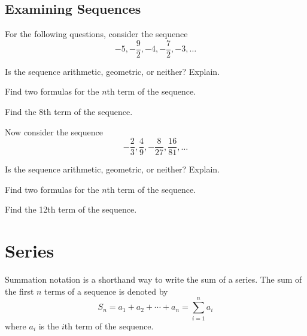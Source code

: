 \documentclass[addpoints]{exam}
\begin{document}
\subsection*{Examining Sequences}\label{subsec:examining_sequences1}
For the following questions, consider the sequence \[-5,-\frac{9}{2},-4,-\frac{7}{2},-3,\ldots\]
\begin{questions}
    \question Is the sequence arithmetic, geometric, or neither? Explain.
    

    \question Find two formulas for the $n$th term of the sequence.


    \question Find the 8th term of the sequence.



\end{questions}

\noindent Now consider the sequence \[-\frac{2}{3},\frac{4}{9},-\frac{8}{27},\frac{16}{81},\ldots\]
\begin{questions}
    \question Is the sequence arithmetic, geometric, or neither? Explain.
    

    \question Find two formulas for the $n$th term of the sequence.


    \question Find the 12th term of the sequence.


\end{questions}

\newpage

\section*{Series}

\begin{tcolorbox}[title=Recall: \textit{Summation Notation},title filled,colframe=black,sharpish corners,width=\linewidth]

Summation notation is a shorthand way to write the sum of a series. The sum of the first $n$ terms of a sequence is denoted by
\[S_n=a_1+a_2+\cdots+a_n=\sum_{i=1}^n a_i\]
where $a_i$ is the $i$th term of the sequence.    
\end{tcolorbox}
\end{document}
